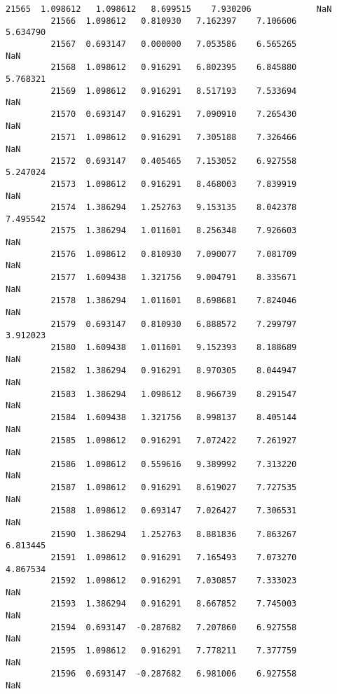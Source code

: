 \documentclass[11pt]{article}
\begin{document}
\begin{Verbatim}[commandchars=\\\{\}]
         21565  1.098612   1.098612   8.699515    7.930206             NaN   
         21566  1.098612   0.810930   7.162397    7.106606        5.634790   
         21567  0.693147   0.000000   7.053586    6.565265             NaN   
         21568  1.098612   0.916291   6.802395    6.845880        5.768321   
         21569  1.098612   0.916291   8.517193    7.533694             NaN   
         21570  0.693147   0.916291   7.090910    7.265430             NaN   
         21571  1.098612   0.916291   7.305188    7.326466             NaN   
         21572  0.693147   0.405465   7.153052    6.927558        5.247024   
         21573  1.098612   0.916291   8.468003    7.839919             NaN   
         21574  1.386294   1.252763   9.153135    8.042378        7.495542   
         21575  1.386294   1.011601   8.256348    7.926603             NaN   
         21576  1.098612   0.810930   7.090077    7.081709             NaN   
         21577  1.609438   1.321756   9.004791    8.335671             NaN   
         21578  1.386294   1.011601   8.698681    7.824046             NaN   
         21579  0.693147   0.810930   6.888572    7.299797        3.912023   
         21580  1.609438   1.011601   9.152393    8.188689             NaN   
         21582  1.386294   0.916291   8.970305    8.044947             NaN   
         21583  1.386294   1.098612   8.966739    8.291547             NaN   
         21584  1.609438   1.321756   8.998137    8.405144             NaN   
         21585  1.098612   0.916291   7.072422    7.261927             NaN   
         21586  1.098612   0.559616   9.389992    7.313220             NaN   
         21587  1.098612   0.916291   8.619027    7.727535             NaN   
         21588  1.098612   0.693147   7.026427    7.306531             NaN   
         21590  1.386294   1.252763   8.881836    7.863267        6.813445   
         21591  1.098612   0.916291   7.165493    7.073270        4.867534   
         21592  1.098612   0.916291   7.030857    7.333023             NaN   
         21593  1.386294   0.916291   8.667852    7.745003             NaN   
         21594  0.693147  -0.287682   7.207860    6.927558             NaN   
         21595  1.098612   0.916291   7.778211    7.377759             NaN   
         21596  0.693147  -0.287682   6.981006    6.927558             NaN   
         

\end{Verbatim}
\end{document}
